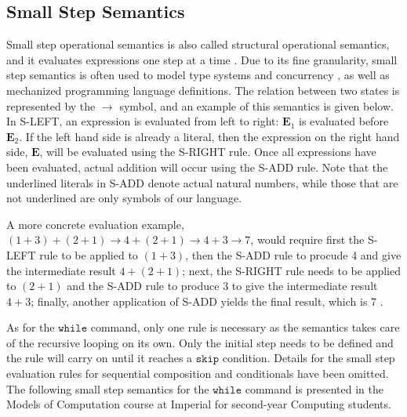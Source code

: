 \documentclass[a4paper,11pt,twoside]{report}
\begin{document}
\subsection{Small Step Semantics}
Small step operational semantics is also called structural operational semantics, and it evaluates expressions one step at a time \cite{Lecture2}. Due to its fine granularity, small step semantics is often used to model type systems and concurrency \cite{chargueraud-13-pretty}, as well as mechanized programming language definitions. The relation between two states is represented by the $\rightarrow$ symbol, and an example of this semantics is given below. In S-LEFT, an expression is evaluated from left to right: $\mathbf{E}_1$ is evaluated before $\mathbf{E}_2$. If the left hand side is already a literal, then the expression on the right hand side, $\mathbf{E}$, will be evaluated using the S-RIGHT rule. Once all expressions have been evaluated, actual addition will occur using the S-ADD rule. Note that the underlined literals in S-ADD denote  actual natural numbers, while those that are not underlined are only symbols of our language.

A more concrete evaluation example, $(1 + 3) + ( 2 + 1 ) \rightarrow 4 + (2 + 1) \rightarrow 4 + 3 \rightarrow 7$, would require first the S-LEFT rule to be applied to $(1 + 3)$, then the S-ADD rule to procude 4 and give the intermediate result $4 + (2 + 1)$; next, the S-RIGHT rule needs to be applied to $(2 + 1)$ and the S-ADD rule to produce 3 to give the intermediate result $4 + 3$; finally, another application of S-ADD yields the final result, which is 7 \cite{Lecture2}.

As for the $\mathtt{while}$ command, only one rule is necessary as the semantics takes care of the recursive looping on its own. Only the initial step needs to be defined and the rule will carry on until it reaches a $\mathtt{skip}$ condition. Details for the small step evaluation rules for sequential composition and conditionals have been omitted. The following small step semantics for the $\mathtt{while}$ command is presented in the Models of Computation course at Imperial for second-year Computing students.
\end{document}
